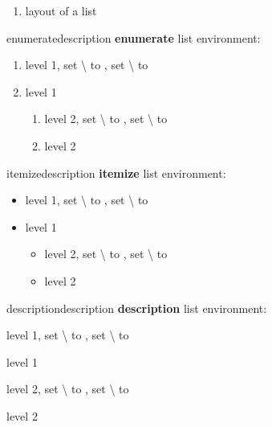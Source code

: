 \documentclass{beamer}
\makeatletter
\newcommand\showDimen[1]{%
  set \textbackslash\expandafter\@gobble\string#1 to \the#1%
}
\newcommand\showList[1]{%
  \def\@envname@{#1}%
  \def\@descriptionname@{description}%
  \ifx\@envname@\@descriptionname@
    \def\@@item@{\item[xx]}%
  \else
    \def\@@item@{\item}%
  \fi
  \textbf{#1} list environment:
  \begin{#1}
    \@@item@ level 1, \showDimen{\itemsep}, \showDimen{\itemindent}\\[3pt]
    \listvalues

    \@@item@ level 1
    \begin{#1}
      \@@item@ level 2, \showDimen{\itemsep}, \showDimen{\itemindent}\\[3pt]
      \listvalues
      
      \@@item@ level 2
    \end{#1}
  \end{#1}
}
\makeatother
\begin{document}
\begin{frame}
  \begin{enumerate}
    \item layout of a list \currentlist
    \drawlist
  \end{enumerate}
\end{frame}

\begin{frame}
  \showList{enumerate} 
\end{frame}

\begin{frame}
  \showList{itemize} 
\end{frame}

\begin{frame}
  \showList{description}
\end{frame}
\end{document}
